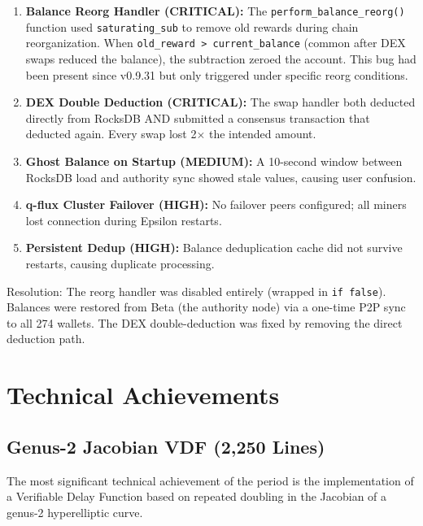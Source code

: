 \documentclass[12pt,a4paper]{article}
\begin{document}
\begin{enumerate}
    \item \textbf{Balance Reorg Handler (CRITICAL):} The \texttt{perform\_balance\_reorg()} function used \texttt{saturating\_sub} to remove old rewards during chain reorganization. When \texttt{old\_reward > current\_balance} (common after DEX swaps reduced the balance), the subtraction zeroed the account. This bug had been present since v0.9.31 but only triggered under specific reorg conditions.

    \item \textbf{DEX Double Deduction (CRITICAL):} The swap handler both deducted directly from RocksDB AND submitted a consensus transaction that deducted again. Every swap lost 2$\times$ the intended amount.

    \item \textbf{Ghost Balance on Startup (MEDIUM):} A 10-second window between RocksDB load and authority sync showed stale values, causing user confusion.

    \item \textbf{q-flux Cluster Failover (HIGH):} No failover peers configured; all miners lost connection during Epsilon restarts.

    \item \textbf{Persistent Dedup (HIGH):} Balance deduplication cache did not survive restarts, causing duplicate processing.
\end{enumerate}

Resolution: The reorg handler was disabled entirely (wrapped in \texttt{if false}). Balances were restored from Beta (the authority node) via a one-time P2P sync to all 274 wallets. The DEX double-deduction was fixed by removing the direct deduction path.

\section{Technical Achievements}

\subsection{Genus-2 Jacobian VDF (2{,}250 Lines)}

The most significant technical achievement of the period is the implementation of a Verifiable Delay Function based on repeated doubling in the Jacobian of a genus-2 hyperelliptic curve.
\end{document}
